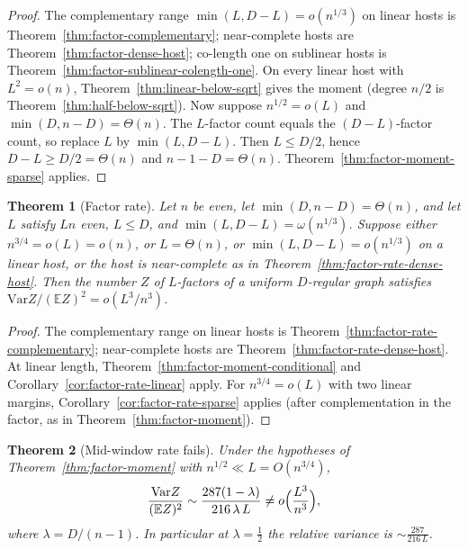 \documentclass[11pt]{article}
\newtheorem{theorem}{Theorem}
\newcommand{\EE}{\mathbb{E}}
\newcommand{\Var}{\mathrm{Var}}
\begin{document}
\begin{proof}
The complementary range \(\min(L,D-L)=o(n^{1/3})\) on linear hosts is
Theorem~\ref{thm:factor-complementary}; near-complete hosts are
Theorem~\ref{thm:factor-dense-host}; co-length one on sublinear hosts is
Theorem~\ref{thm:factor-sublinear-colength-one}.
On every linear host with \(L^2=o(n)\), Theorem~\ref{thm:linear-below-sqrt}
gives the moment (degree \(n/2\) is Theorem~\ref{thm:half-below-sqrt}).
Now suppose \(n^{1/2}=o(L)\) and \(\min(D,n-D)=\Theta(n)\). The \(L\)-factor
count equals the \((D-L)\)-factor count, so replace \(L\) by \(\min(L,D-L)\).
Then \(L\le D/2\), hence \(D-L\ge D/2=\Theta(n)\) and
\(n-1-D=\Theta(n)\). Theorem~\ref{thm:factor-moment-sparse} applies.
\end{proof}

\begin{theorem}[Factor rate]
\label{thm:factor-rate}
\label{conj:factor-rate}
Let \(n\) be even, let \(\min(D,n-D)=\Theta(n)\), and let \(L\) satisfy \(Ln\) even,
\(L\le D\), and \(\min(L,D-L)=\omega(n^{1/3})\). Suppose either
\(n^{3/4}=o(L)=o(n)\), or \(L=\Theta(n)\), or \(\min(L,D-L)=o(n^{1/3})\) on a
linear host, or the host is near-complete as in
Theorem~\ref{thm:factor-rate-dense-host}.
Then the number \(Z\) of \(L\)-factors of a uniform \(D\)-regular graph satisfies
\(\Var Z/(\EE Z)^2=o(L^3/n^3)\).
\end{theorem}

\begin{proof}
The complementary range on linear hosts is
Theorem~\ref{thm:factor-rate-complementary}; near-complete hosts are
Theorem~\ref{thm:factor-rate-dense-host}.
At linear length, Theorem~\ref{thm:factor-moment-conditional} and
Corollary~\ref{cor:factor-rate-linear} apply.
For \(n^{3/4}=o(L)\) with two linear margins,
Corollary~\ref{cor:factor-rate-sparse} applies (after complementation in the
factor, as in Theorem~\ref{thm:factor-moment}).
\end{proof}

\begin{theorem}[Mid-window rate fails]
\label{thm:factor-rate-mid-fail}
\label{conj:factor-rate-mid}
Under the hypotheses of Theorem~\ref{thm:factor-moment} with
\(n^{1/2}\ll L=O(n^{3/4})\),
\[
\frac{\Var Z}{(\EE Z)^2}
\sim
\frac{287(1-\lambda)}{216\,\lambda\,L}
\ne
o\Bigl(\frac{L^3}{n^3}\Bigr),
\]
where \(\lambda=D/(n-1)\). In particular at \(\lambda=\tfrac12\) the relative
variance is \(\sim\frac{287}{216\,L}\).
\end{theorem}
\end{document}

